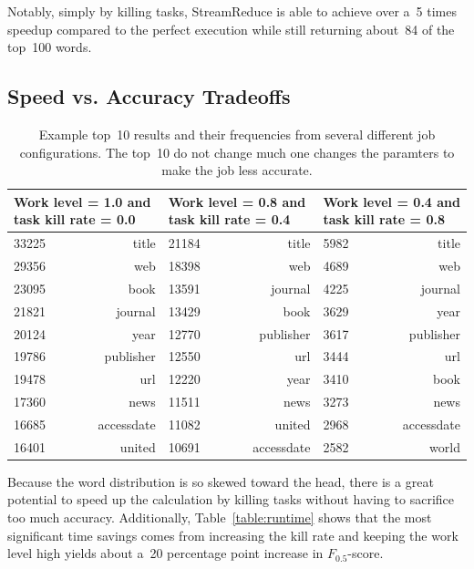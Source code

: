 \documentclass[12pt,twocolumn]{article}
\begin{document}
Notably, simply by killing tasks, StreamReduce is able to achieve over a~5 times speedup compared
to the perfect execution while still returning about~84 of the top~100 words.

\subsection{Speed vs. Accuracy Tradeoffs}
\begin{center}
\begin{table}
  \begin{tabularx}{\linewidth}{|lr|lr|lr|}
    \hline
    \multicolumn{2}{|X|}{Work level = 1.0 and task kill rate = 0.0} &
    \multicolumn{2}{|X|}{Work level = 0.8 and task kill rate = 0.4} &
    \multicolumn{2}{|X|}{Work level = 0.4 and task kill rate = 0.8} \\ \hline
    33225 & title & 21184 & title & 5982 & title \\ \hline
    29356 & web & 18398 & web & 4689 & web \\ \hline
    23095 & book & 13591 & journal & 4225 & journal \\ \hline
    21821 & journal & 13429 & book & 3629 & year \\ \hline
    20124 & year & 12770 & publisher & 3617 & publisher \\ \hline
    19786 & publisher & 12550 & url & 3444 & url \\ \hline
    19478 & url & 12220 & year & 3410 & book \\ \hline
    17360 & news & 11511 & news & 3273 & news \\ \hline
    16685 & accessdate & 11082 & united & 2968 & accessdate \\ \hline
    16401 & united & 10691 & accessdate & 2582 & world \\ \hline
  \end{tabularx}
  \caption{Example top~10 results and their frequencies from several different job configurations. The top~10 do not change much one changes the paramters to make the job less accurate.}
  \label{table:top10}
\end{table}
\end{center}

Because the word distribution is so skewed toward the head, there is a great potential to
speed up the calculation by killing tasks without having to sacrifice too much accuracy.
Additionally, Table~\ref{table:runtime} shows that the most significant time savings comes
from increasing the kill rate and keeping the work level high yields about a~20 percentage point
increase in $F_{0.5}$-score.
\end{document}
